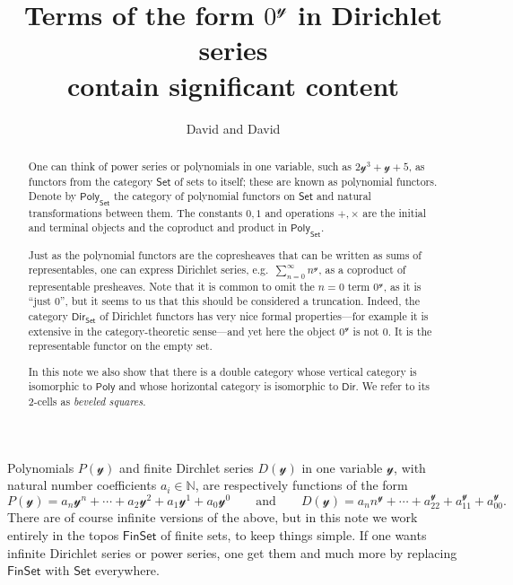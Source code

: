 \documentclass[11pt, article, one side]{memoir}
\theoremstyle{theorem}
\theoremstyle{definition}
\theoremstyle{remark}
\newcommand{\cat}[1]{\mathcal{#1}}%
\newcommand{\Cat}[1]{\mathsf{#1}}%
\newcommand{\nn}{\mathbb{N}}
\newcommand{\smset}{\Cat{Set}}
\newcommand{\finset}{\Cat{FinSet}}
\newcommand{\yon}{\mathcal{y}}
\newcommand{\poly}{\Cat{Poly}}
\newcommand{\dir}{\Cat{Dir}}
\newcommand{\qqand}{\qquad\text{and}\qquad}
\begin{document}
\title{Terms of the form $0^\yon$ in Dirichlet series\\contain significant content}

\author{David and David}

\maketitle
\begin{abstract}
One can think of power series or polynomials in one variable, such as $2\yon^3+\yon+5$, as functors from the category $\smset$ of sets to itself; these are known as polynomial functors. Denote by $\poly_\smset$ the category of polynomial functors on $\smset$ and natural transformations between them. The constants $0,1$ and operations $+,\times$ are the initial and terminal objects and the coproduct and product in $\poly_\smset$. 

Just as the polynomial functors are the copresheaves that can be written as sums of representables, one can express Dirichlet series, e.g.\ $\sum_{n=0}^\infty n^\yon$, as a coproduct of representable presheaves. Note that it is common to omit the $n=0$ term $0^\yon$, as it is ``just 0'', but it seems to us that this should be considered a truncation. Indeed, the category $\dir_\smset$ of Dirichlet functors has very nice formal properties---for example it is extensive in the category-theoretic sense---and yet here the object $0^\yon$ is not $0$. It is the representable functor on the empty set.

In this note we also show that there is a double category whose vertical category is isomorphic to $\poly$ and whose horizontal category is isomorphic to $\dir$. We refer to its 2-cells as \emph{beveled squares}.
\end{abstract}

Polynomials $P(\yon)$ and finite Dirchlet series $D(\yon)$ in one variable $\cat{y}$, with natural number coefficients $a_i\in\nn$, are respectively functions of the form
\[
  P(\yon)=a_n\yon^n+\cdots+a_2\yon^2+a_1\yon^1+a_0\yon^0
  \qqand
  D(\yon)=a_nn^\yon+\cdots+a_22^\yon+a_11^\yon+a_00^\yon.
\]
There are of course infinite versions of the above, but in this note we work entirely in the topos $\finset$ of finite sets, to keep things simple. If one wants infinite Dirichlet series or power series, one get them and much more by replacing $\finset$ with $\smset$ everywhere.
\end{document}
